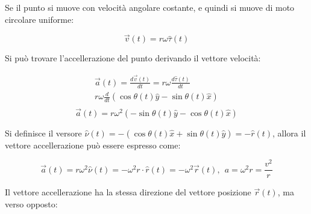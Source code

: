 \documentclass{article}
\numberwithin{equation}{subsection}
\begin{document}
\begin{center}\end{center}

Se il punto si muove con velocità angolare costante, e quindi si 
muove di moto circolare uniforme:

\begin{equation}
    \vec{v}(t)=r\omega\hat{\tau}(t)
\end{equation}

Si può trovare l'accellerazione del punto derivando il vettore 
velocità:

\begin{gather*}
    \vec{a}(t)=\displaystyle\frac{d\vec{v}(t)}{dt}=
    r\omega\frac{d\hat{\tau}(t)}{dt}\\
    r\omega\frac{d}{dt}(\cos\theta(t)\hat{y}-\sin\theta(t)\hat{x})\\
\end{gather*}
\begin{equation}
    \vec{a}(t)=    r\omega^{2}(-\sin\theta(t)\hat{y}-\cos\theta(t)\hat{x})
\end{equation}

Si definisce il versore $\hat{\nu}(t)=-(\cos\theta(t)\hat{x}+\sin\theta(t)\hat{y})=-\hat{r}(t)$, allora il vettore accellerazione può essere espresso come:

\begin{equation}
    \vec{a}(t)=r\omega^{2}\hat{\nu}(t)=-\omega^{2}r\cdot\hat{r}(t)=-\omega^{2}\vec{r}(t){,}\:\: a=\omega^{2}r=\displaystyle\frac{v^{2}}{r}
\end{equation}

Il vettore accellerazione ha la stessa direzione del vettore 
posizione $\vec{r}(t)$, ma verso opposto:
\end{document}
